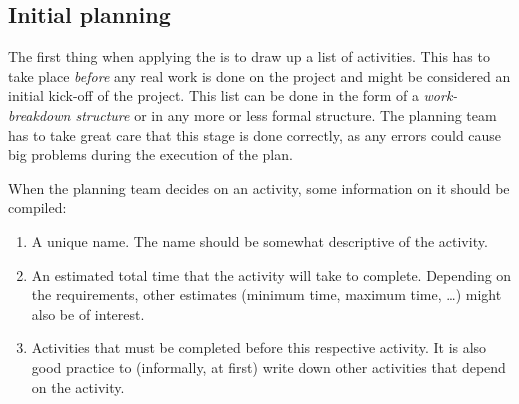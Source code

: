 \subsection{Initial planning}\label{subsec:initial_planning}
The first thing when applying the \cpm{} is to draw up a list of activities. This has to take place
\emph{before} any real work is done on the project and might be considered an initial kick-off of
the project. This list can be done in the
form of a \emph{work-breakdown structure} or in any more or less formal structure. The planning team
has to take great care that this stage is done correctly, as any errors could cause big problems
during the execution of the plan.

When the planning team decides on an activity, some information on it should be compiled:
\begin{enumerate}
  \item A unique name. The name should be somewhat descriptive of the activity.
  \item An estimated total time that the activity will take to complete. Depending on the
    requirements, other estimates (minimum time, maximum time, \ldots) might also be of interest.
  \item Activities that must be completed before this respective activity. It is also good practice
    to (informally, at first) write down other activities that depend on the activity.
\end{enumerate}

